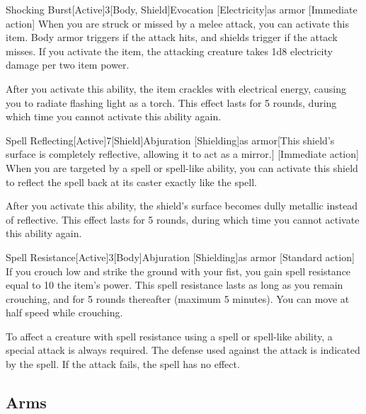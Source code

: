 \begin{magicitemdef}{Shocking Burst}[Active]{3}[Body, Shield]{Evocation [Electricity]}{as armor}
    [Immediate action] When you are struck or missed by a melee attack, you can activate this item.
    Body armor triggers if the attack hits, and shields trigger if the attack misses.
    If you activate the item, the attacking creature takes 1d8 electricity damage per two item power.

    After you activate this ability, the item crackles with electrical energy, causing you to radiate flashing light as a torch.
    This effect lasts for 5 rounds, during which time you cannot activate this ability again.
\end{magicitemdef}

\begin{magicitemdef}{Spell Reflecting}[Active]{7}[Shield]{Abjuration [Shielding]}{as armor}[This shield's surface is completely reflective, allowing it to act as a mirror.]
    [Immediate action] When you are targeted by a spell or spell-like ability, you can activate this shield to reflect the spell back at its caster exactly like the  spell.

    After you activate this ability, the shield's surface becomes dully metallic instead of reflective.
    This effect lasts for 5 rounds, during which time you cannot activate this ability again.
\end{magicitemdef}

\begin{magicitemdef}{Spell Resistance}[Active]{3}[Body]{Abjuration [Shielding]}{as armor}
    [Standard action] If you crouch low and strike the ground with your fist, you gain spell resistance equal to 10 \add the item's power.
    This spell resistance lasts as long as you remain crouching, and for 5 rounds thereafter (maximum 5 minutes).
    You can move at half speed while crouching.

    To affect a creature with spell resistance using a spell or spell-like ability, a special attack is always required.
    The defense used against the attack is indicated by the spell.
    If the attack fails, the spell has no effect.
\end{magicitemdef}

\subsection{Arms}


